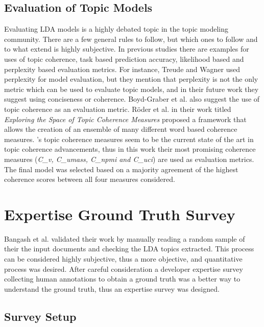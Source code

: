     \subsection{Evaluation of Topic Models\label{evaluationMetric}}
    
        Evaluating LDA models is a highly debated topic in the topic modeling community. There are a few general rules to follow, but which ones to follow and to what extend is highly subjective. In previous studies there are examples for uses of topic coherence, task based prediction accuracy, likelihood based and perplexity based evaluation metrics. For instance, Treude and Wagner \cite{treude2019predicting} used perplexity for model evaluation, but they mention that perplexity is not the only metric which can be used to evaluate topic models, and in their future work they suggest using conciseness or coherence. Boyd-Graber et al. \cite{boyd2014care} also suggest the use of topic coherence as an evaluation metric. R{\"o}der et al. \cite{roder2015exploring} in their work titled \textit{Exploring the Space of Topic Coherence Measures} proposed a framework that allows the creation of an ensemble of many different word based coherence measures. \cite{roder2015exploring}'s topic coherence measures seem to be the current state of the art in topic coherence advancements, thus in this work their most promising coherence measures (\emph{C\_v, C\_umass, C\_npmi and C\_uci}) are used as evaluation metrics. The final model was selected based on a majority agreement of the highest coherence scores between all four measures considered.
    
    \section{Expertise Ground Truth Survey\label{expertiseSurvey}}
    
        Bangash et al. \cite{bangash2019developers} validated their work by manually reading a random sample of their the input documents and checking the LDA topics extracted. This process can be considered highly subjective, thus a more objective, and quantitative process was desired. After careful consideration a developer expertise survey collecting human annotations to obtain a ground truth was a better way to understand the ground truth, thus an expertise survey was designed. 
    
        \subsection{Survey Setup}
        
